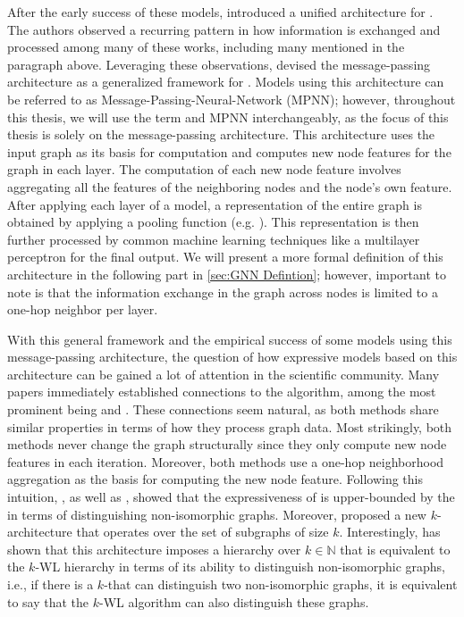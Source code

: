 After the early success of these \gnn models, \cite{Gil+2017} introduced a unified architecture for \gnns. The authors observed a recurring pattern in how information is exchanged and processed among many of these works, including many mentioned in the paragraph above. Leveraging these observations, \cite{Gil+2017} devised the message-passing architecture as a generalized framework for \gnns. Models using this architecture can be referred to as Message-Passing-Neural-Network (\textsf{MPNN}); however, throughout this thesis, we will use the term \gnn and \textsf{MPNN} interchangeably, as the focus of this thesis is solely on the message-passing architecture. 
This architecture uses the input graph as its basis for computation and computes new node features for the graph in each layer. The computation of each new node feature involves aggregating all the features of the neighboring nodes and the node's own feature. After applying each layer of a \gnn model, a representation of the entire graph is obtained by applying a pooling function (e.g. \cite{Ying2018}). This representation is then further processed by common machine learning techniques like a multilayer perceptron for the final output. We will present a more formal definition of this architecture in the following part in \cref{sec:GNN Defintion}; however, important to note is that the information exchange in the graph across nodes is limited to a one-hop neighbor per layer.
 
With this general framework and the empirical success of some models using this message-passing architecture, the question of how expressive models based on this architecture can be gained a lot of attention in the scientific community. Many papers immediately established connections to the \wl algorithm, among the most prominent being \cite{Morris2018} and \cite{Xu2018}. These connections seem natural, as both methods share similar properties in terms of how they process graph data. Most strikingly, both methods never change the graph structurally since they only compute new node features in each iteration. Moreover, both methods use a one-hop neighborhood aggregation as the basis for computing the new node feature. Following this intuition, \cite{Morris2018}, as well as \cite{Xu2018}, showed that the expressiveness of \gnns is upper-bounded by the \wl in terms of distinguishing non-isomorphic graphs. Moreover, \cite{Morris2018} proposed a new $k$-\gnn architecture that operates over the set of subgraphs of size $k$. Interestingly, \cite{Geerts2020} has shown that this architecture imposes a hierarchy over $k \in \mathbb{N}$ that is equivalent to the $k$-WL hierarchy in terms of its ability to distinguish non-isomorphic graphs, i.e., if there is a $k$-\gnn that can distinguish two non-isomorphic graphs, it is equivalent to say that the $k$-WL algorithm can also distinguish these graphs.

